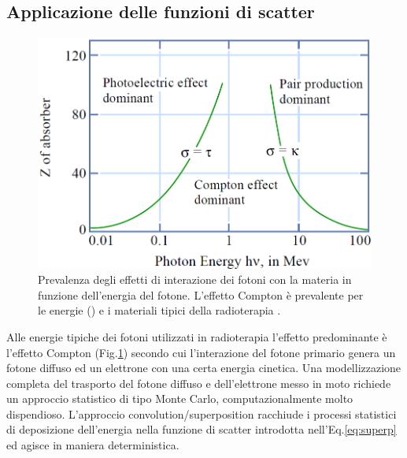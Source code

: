 {\subsection{Applicazione delle funzioni di scatter}
\label{sec:scatter_fun}

\begin{figure}
\centering
\includegraphics[width=.7\textwidth]{./cap1/compt_dom.png}
\caption{Prevalenza degli effetti di interazione dei fotoni con la materia in funzione dell'energia del fotone. L'effetto Compton è prevalente per le energie () e i materiali tipici della radioterapia .}
\label{fig:compt_dom}
\end{figure}
Alle energie tipiche dei fotoni utilizzati in radioterapia l'effetto predominante è l'effetto Compton (Fig.\ref{fig:compt_dom}) secondo cui l'interazione del fotone primario genera un fotone diffuso ed un elettrone con una certa energia cinetica. Una modellizzazione completa del trasporto del fotone diffuso e dell'elettrone messo in moto richiede un approccio statistico di tipo Monte Carlo, computazionalmente molto dispendioso. L'approccio convolution/superposition racchiude i processi statistici di deposizione dell'energia nella funzione di scatter introdotta nell'Eq.\eqref{eq:superp} ed agisce in maniera deterministica.

}
